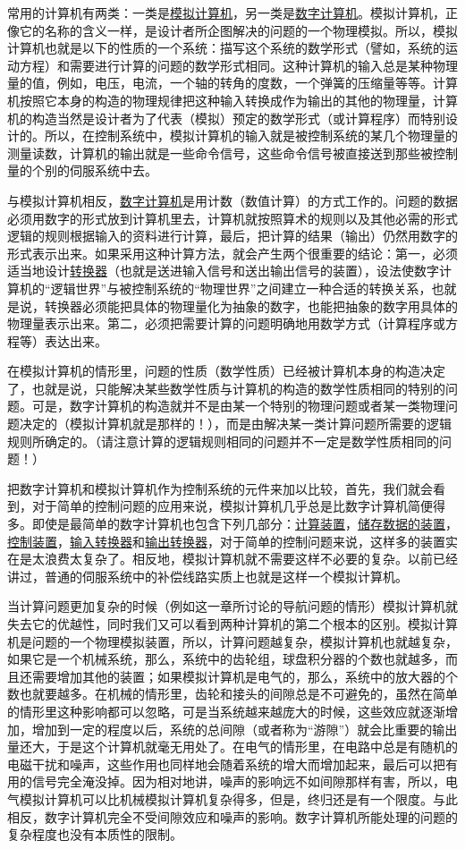 常用的计算机有两类：一类是\underline{模拟计算机}，另一类是\underline{数字计算机}。模拟计算机，正像它的名称的含义一样，是设计者所企图解决的问题的一个物理模拟。所以，模拟计算机也就是以下的性质的一个系统：描写这个系统的数学形式（譬如，系统的运动方程）和需要进行计算的问题的数学形式相同。这种计算机的输入总是某种物理量的值，例如，电压，电流，一个轴的转角的度数，一个弹簧的压缩量等等。计算机按照它本身的构造的物理规律把这种输入转换成作为输出的其他的物理量，计算机的构造当然是设计者为了代表（模拟）预定的数学形式（或计算程序）而特别设计的。所以，在控制系统中，模拟计算机的输入就是被控制系统的某几个物理量的测量读数，计算机的输出就是一些命令信号，这些命令信号被直接送到那些被控制量的个别的伺服系统中去。

与模拟计算机相反，\underline{数字计算机}是用计数（数值计算）的方式工作的。问题的数据必须用数字的形式放到计算机里去，计算机就按照算术的规则以及其他必需的形式逻辑的规则根据输入的资料进行计算，最后，把计算的结果（输出）仍然用数字的形式表示出来。如果采用这种计算方法，就会产生两个很重要的结论：第一，必须适当地设计\underline{转换器}（也就是送进输入信号和送出输出信号的装置），设法使数字计算机的“逻辑世界”与被控制系统的“物理世界”之间建立一种合适的转换关系，也就是说，转换器必须能把具体的物理量化为抽象的数字，也能把抽象的数字用具体的物理量表示出来。第二，必须把需要计算的问题明确地用数学方式（计算程序或方程等）表达出来。

在模拟计算机的情形里，问题的性质（数学性质）已经被计算机本身的构造决定了，也就是说，只能解决某些数学性质与计算机的构造的数学性质相同的特别的问题。可是，数字计算机的构造就并不是由某一个特别的物理问题或者某一类物理问题决定的（模拟计算机就是那样的！），而是由解决某一类计算问题所需要的逻辑规则所确定的。（请注意计算的逻辑规则相同的问题并不一定是数学性质相同的问题！）

把数字计算机和模拟计算机作为控制系统的元件来加以比较，首先，我们就会看到，对于简单的控制问题的应用来说，模拟计算机几乎总是比数字计算机简便得多。即使是最简单的数字计算机也包含下列几部分：\underline{计算装置}，\underline{储存数据的装置}，\underline{控制装置}，\underline{输入转换器}和\underline{输出转换器}，对于简单的控制问题来说，这样多的装置实在是太浪费太复杂了。相反地，模拟计算机就不需要这样不必要的复杂。以前已经讲过，普通的伺服系统中的补偿线路实质上也就是这样一个模拟计算机。

当计算问题更加复杂的时候（例如这一章所讨论的导航问题的情形）模拟计算机就失去它的优越性，同时我们又可以看到两种计算机的第二个根本的区别。模拟计算机是问题的一个物理模拟装置，所以，计算问题越复杂，模拟计算机也就越复杂，如果它是一个机械系统，那么，系统中的齿轮组，球盘积分器的个数也就越多，而且还需要增加其他的装置；如果模拟计算机是电气的，那么，系统中的放大器的个数也就要越多。在机械的情形里，齿轮和接头的间隙总是不可避免的，虽然在简单的情形里这种影响都可以忽略，可是当系统越来越庞大的时候，这些效应就逐渐增加，增加到一定的程度以后，系统的总间隙（或者称为“游隙”）就会比重要的输出量还大，于是这个计算机就毫无用处了。在电气的情形里，在电路中总是有随机的电磁干扰和噪声，这些作用也同样地会随着系统的增大而增加起来，最后可以把有用的信号完全淹没掉。因为相对地讲，噪声的影响远不如间隙那样有害，所以，电气模拟计算机可以比机械模拟计算机复杂得多，但是，终归还是有一个限度。与此相反，数字计算机完全不受间隙效应和噪声的影响。数字计算机所能处理的问题的复杂程度也没有本质性的限制。

